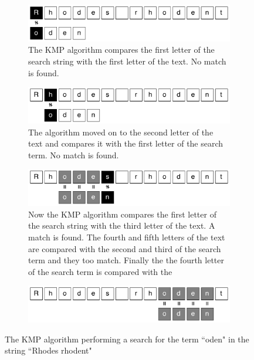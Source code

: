 \documentclass{article}
\begin{document}
\begin{figure}[h!bt]
  
  \centering
  
  \begin{subfigure}{\textwidth}
  \makeatletter
  \includegraphics[width=\textwidth]{images/knuth-morris-pratt-1}
  \caption{The KMP algorithm compares the first letter of the search string with the first letter of the text. No match is found.}
  \end{subfigure}
  
  \begin{subfigure}{\textwidth}
  \makeatletter
  \includegraphics[width=\textwidth]{images/knuth-morris-pratt-2}
  \caption{The algorithm moved on to the second letter of the text and compares it with the first letter of the search term. No match is found.}
  \end{subfigure}
  
  \begin{subfigure}{\textwidth}
  \makeatletter
  \includegraphics[width=\textwidth]{images/knuth-morris-pratt-3}
  \caption{Now the KMP algorithm compares the first letter of the search string with the third letter of the text. A match is found. The fourth and fifth letters of the text are compared with the second and third of the search term and they too match. Finally the the fourth letter of the search term is compared with the }
  \end{subfigure}
  
  \begin{subfigure}{\textwidth}
  \makeatletter
  \includegraphics[width=\textwidth]{images/knuth-morris-pratt-4}
  \caption{}
  \end{subfigure}

  
  \caption{The KMP algorithm performing a search for the term ``oden" in the string ``Rhodes rhodent"}
  \label{fig:knuth-morris-pratt}
\end{figure}
\end{document}
